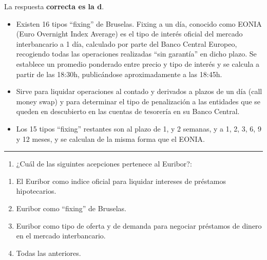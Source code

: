 \documentclass[
  letterpaper,
  DIV=11,
  numbers=noendperiod]{scrreprt}
\providecommand{\tightlist}{%
  \setlength{\itemsep}{0pt}\setlength{\parskip}{0pt}}\usepackage{longtable,booktabs,array}
\begin{document}
\begin{tcolorbox}[enhanced jigsaw, left=2mm, opacityback=0, colback=white, breakable, arc=.35mm, bottomrule=.15mm, rightrule=.15mm, toprule=.15mm, leftrule=.75mm, colframe=quarto-callout-tip-color-frame]
\begin{minipage}[t]{5.5mm}
\textcolor{quarto-callout-tip-color}{\faLightbulb}
\end{minipage}%
\begin{minipage}[t]{\textwidth - 5.5mm}

La respuesta \textbf{correcta es la d}.

\begin{itemize}
\item
  Existen 16 tipos ``fixing'' de Bruselas. Fixing a un día, conocido
  como EONIA (Euro Overnight Index Average) es el tipo de interés
  oficial del mercado interbancario a 1 día, calculado por parte del
  Banco Central Europeo, recogiendo todas las operaciones realizadas
  ``sin garantía'' en dicho plazo. Se establece un promedio ponderado
  entre precio y tipo de interés y se calcula a partir de las 18:30h,
  publicándose aproximadamente a las 18:45h.
\item
  Sirve para liquidar operaciones al contado y derivados a plazos de un
  día (call money swap) y para determinar el tipo de penalización a las
  entidades que se queden en descubierto en las cuentas de tesorería en
  su Banco Central.
\item
  Los 15 tipos ``fixing'' restantes son al plazo de 1, y 2 semanas, y a
  1, 2, 3, 6, 9 y 12 meses, y se calculan de la misma forma que el
  EONIA.
\end{itemize}

\end{minipage}%
\end{tcolorbox}

\begin{center}\rule{0.5\linewidth}{0.5pt}\end{center}

\begin{enumerate}
\def\labelenumi{\arabic{enumi}.}
\setcounter{enumi}{44}
\tightlist
\item
  ¿Cuál de las siguintes acepciones pertenece al Euribor?:
\end{enumerate}

\begin{enumerate}
\def\labelenumi{\alph{enumi}.}
\item
  El Euribor como indice oficial para liquidar intereses de préstamos
  hipotecarios.
\item
  Euribor como ``fixing'' de Bruselas.
\item
  Euribor como tipo de oferta y de demanda para negociar préstamos de
  dinero en el mercado interbancario.
\item
  Todas las anteriores.
\end{enumerate}
\end{document}
